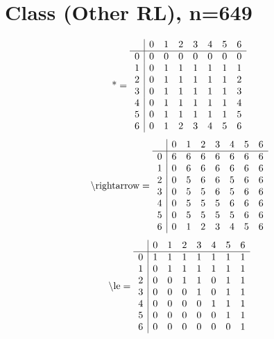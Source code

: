 \documentclass[11pt]{article}
\begin{document}
\section{Class (Other RL), n=649}
\[\text{*} = 
\begin{array}{r | r r r r r r r}
 & 0 & 1 & 2 & 3 & 4 & 5 & 6 \\ \hline
0 & 0 & 0 & 0 & 0 & 0 & 0 & 0 \\
1 & 0 & 1 & 1 & 1 & 1 & 1 & 1 \\
2 & 0 & 1 & 1 & 1 & 1 & 1 & 2 \\
3 & 0 & 1 & 1 & 1 & 1 & 1 & 3 \\
4 & 0 & 1 & 1 & 1 & 1 & 1 & 4 \\
5 & 0 & 1 & 1 & 1 & 1 & 1 & 5 \\
6 & 0 & 1 & 2 & 3 & 4 & 5 & 6 \\
\end{array}
\]
\[\text{\textbackslash rightarrow} = 
\begin{array}{r | r r r r r r r}
 & 0 & 1 & 2 & 3 & 4 & 5 & 6 \\ \hline
0 & 6 & 6 & 6 & 6 & 6 & 6 & 6 \\
1 & 0 & 6 & 6 & 6 & 6 & 6 & 6 \\
2 & 0 & 5 & 6 & 6 & 5 & 6 & 6 \\
3 & 0 & 5 & 5 & 6 & 5 & 6 & 6 \\
4 & 0 & 5 & 5 & 5 & 6 & 6 & 6 \\
5 & 0 & 5 & 5 & 5 & 5 & 6 & 6 \\
6 & 0 & 1 & 2 & 3 & 4 & 5 & 6 \\
\end{array}
\]
\[\text{\textbackslash le} = 
\begin{array}{r | r r r r r r r}
 & 0 & 1 & 2 & 3 & 4 & 5 & 6 \\ \hline
0 & 1 & 1 & 1 & 1 & 1 & 1 & 1 \\
1 & 0 & 1 & 1 & 1 & 1 & 1 & 1 \\
2 & 0 & 0 & 1 & 1 & 0 & 1 & 1 \\
3 & 0 & 0 & 0 & 1 & 0 & 1 & 1 \\
4 & 0 & 0 & 0 & 0 & 1 & 1 & 1 \\
5 & 0 & 0 & 0 & 0 & 0 & 1 & 1 \\
6 & 0 & 0 & 0 & 0 & 0 & 0 & 1 \\
\end{array}
\]
\end{document}
